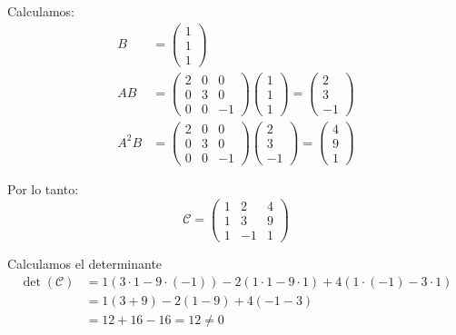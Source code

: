 \documentclass[
  11pt,
  letterpaper,
   addpoints,
   answers
  ]{exam}
\begin{document}
\begin{questions}
\begin{parts}
\begin{solution}
        Calculamos:
        \begin{align}
            B &= \begin{pmatrix} 1\\ 1\\ 1 \end{pmatrix}\\[6pt]
            AB &= \begin{pmatrix} 2 & 0 & 0\\ 0 & 3 & 0\\ 0 & 0 & -1 \end{pmatrix} \begin{pmatrix} 1\\ 1\\ 1 \end{pmatrix} = \begin{pmatrix} 2\\ 3\\ -1 \end{pmatrix}\\[6pt]
            A^2B &= \begin{pmatrix} 2 & 0 & 0\\ 0 & 3 & 0\\ 0 & 0 & -1 \end{pmatrix} \begin{pmatrix} 2\\ 3\\ -1 \end{pmatrix} = \begin{pmatrix} 4\\ 9\\ 1 \end{pmatrix}
        \end{align}

        Por lo tanto:
        \begin{equation}
            \mathcal{C} = \begin{pmatrix} 1 & 2 & 4\\ 1 & 3 & 9\\ 1 & -1 & 1 \end{pmatrix}
        \end{equation}

        Calculamos el determinante
        \begin{align}
            \det(\mathcal{C}) &= 1(3 \cdot 1 - 9 \cdot (-1)) - 2(1 \cdot 1 - 9 \cdot 1) + 4(1 \cdot (-1) - 3 \cdot 1)\\
            &= 1(3 + 9) - 2(1 - 9) + 4(-1 - 3)\\
            &= 12 + 16 - 16 = 12 \neq 0
        \end{align}


\end{solution}
\end{parts}
\end{questions}
\end{document}
